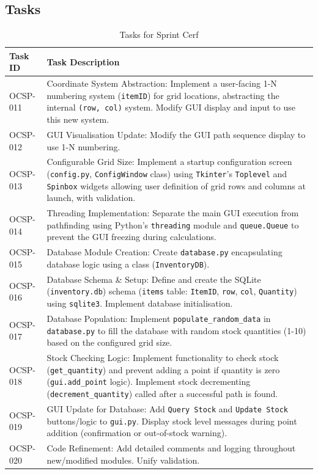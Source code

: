 \subsection{Tasks}

\begin{table}[htbp]
	\centering
	\begin{tabularx}{\textwidth}{|l|X|}
		\hline
		\textbf{Task ID} & \textbf{Task Description} \\
		\hline
		OCSP-011 & Coordinate System Abstraction: Implement a user-facing 1-N numbering system (\verb|itemID|) for grid locations, abstracting the internal \verb|(row, col)| system. Modify GUI display and input to use this new system. \\
		\hline
		OCSP-012 & GUI Visualisation Update: Modify the GUI path sequence display to use 1-N numbering. \\
		\hline
		OCSP-013 & Configurable Grid Size: Implement a startup configuration screen (\verb|config.py|, \verb|ConfigWindow| class) using \verb|Tkinter|'s \verb|Toplevel| and \verb|Spinbox| widgets allowing user definition of grid rows and columns at launch, with validation. \\
		\hline
		OCSP-014 & Threading Implementation: Separate the main GUI execution from pathfinding using Python's \verb|threading| module and \verb|queue.Queue| to prevent the GUI freezing during calculations. \\
		\hline
		OCSP-015 & Database Module Creation: Create \verb|database.py| encapsulating database logic using a class (\verb|InventoryDB|). \\
		\hline
		OCSP-016 & Database Schema \& Setup: Define and create the SQLite (\verb|inventory.db|) schema (\verb|items| table: \verb|ItemID|, \verb|row|, \verb|col|, \verb|Quantity|) using \verb|sqlite3|. Implement database initialisation. \\
		\hline
		OCSP-017 & Database Population: Implement \verb|populate_random_data| in \verb|database.py| to fill the database with random stock quantities (1-10) based on the configured grid size. \\
		\hline
		OCSP-018 & Stock Checking Logic: Implement functionality to check stock (\verb|get_quantity|) and prevent adding a point if quantity is zero (\verb|gui.add_point| logic). Implement stock decrementing (\verb|decrement_quantity|) called after a successful path is found. \\
		\hline
		OCSP-019 & GUI Update for Database: Add \verb|Query Stock| and \verb|Update Stock| buttons/logic to \verb|gui.py|. Display stock level messages during point addition (confirmation or out-of-stock warning). \\
		\hline
		OCSP-020 & Code Refinement: Add detailed comments and logging throughout new/modified modules. Unify validation. \\
		\hline
	\end{tabularx}
	\caption{Tasks for Sprint Cerf}
\end{table}

